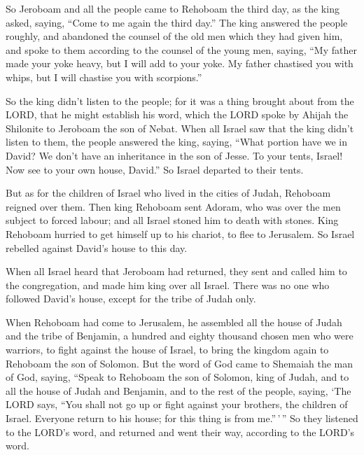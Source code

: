  So Jeroboam and all the people came to Rehoboam the third
day, as the king asked, saying, ``Come to me again the third day.''
 The king answered the people roughly, and abandoned the
counsel of the old men which they had given him,  and spoke
to them according to the counsel of the young men, saying, ``My father
made your yoke heavy, but I will add to your yoke. My father chastised
you with whips, but I will chastise you with scorpions.''

 So the king didn't listen to the people; for it was a
thing brought about from the LORD, that he might establish his word,
which the LORD spoke by Ahijah the Shilonite to Jeroboam the son of
Nebat.  When all Israel saw that the king didn't listen to
them, the people answered the king, saying, ``What portion have we in
David? We don't have an inheritance in the son of Jesse. To your tents,
Israel! Now see to your own house, David.'' So Israel departed to their
tents.

 But as for the children of Israel who lived in the cities
of Judah, Rehoboam reigned over them.  Then king Rehoboam
sent Adoram, who was over the men subject to forced labour; and all
Israel stoned him to death with stones. King Rehoboam hurried to get
himself up to his chariot, to flee to Jerusalem.  So Israel
rebelled against David's house to this day.

 When all Israel heard that Jeroboam had returned, they
sent and called him to the congregation, and made him king over all
Israel. There was no one who followed David's house, except for the
tribe of Judah only.

 When Rehoboam had come to Jerusalem, he assembled all the
house of Judah and the tribe of Benjamin, a hundred and eighty thousand
chosen men who were warriors, to fight against the house of Israel, to
bring the kingdom again to Rehoboam the son of Solomon. 
But the word of God came to Shemaiah the man of God, saying,
 ``Speak to Rehoboam the son of Solomon, king of Judah, and
to all the house of Judah and Benjamin, and to the rest of the people,
saying,  `The LORD says, ``You shall not go up or fight
against your brothers, the children of Israel. Everyone return to his
house; for this thing is from me.''\,'\,'' So they listened to the
LORD's word, and returned and went their way, according to the LORD's
word.

